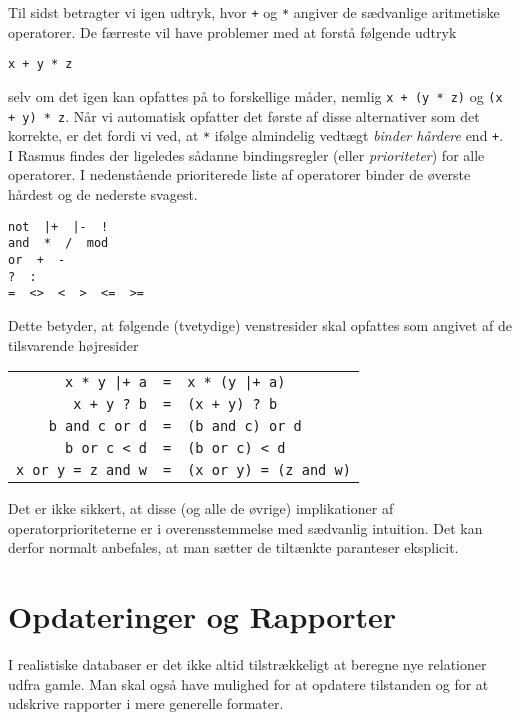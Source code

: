 Til sidst betragter vi igen udtryk, hvor \verb"+" og \verb"*" angiver de
s\ae{}dvanlige aritmetiske operatorer. De f\ae{}rreste vil have
problemer med at forst\aa{} f\o{}lgende udtryk
\begin{center}
\verb"x + y * z"
\end{center}
selv om det igen kan opfattes p\aa{} to forskellige m\aa{}der, nemlig
\verb"x + (y * z)" og \verb"(x + y) * z". N\aa{}r vi automatisk opfatter
det f\o{}rste af disse alternativer som det korrekte, er det fordi vi 
ved, at \verb"*" if\o{}lge almindelig vedt\ae{}gt {\em binder h\aa{}rdere\/}
end \verb"+". I {\sc Rasmus} findes der ligeledes s\aa{}danne
bindings\-reg\-ler (eller {\em prioriteter}) 
for alle operatorer. I nedenst\aa{}ende prioriterede
liste af operatorer
binder de \o{}verste h\aa{}rdest og de nederste svagest.
\begin{center}
\verb"not  |+  |-  !"\\
\verb"and  *  /  mod"\\
\verb"or  +  -"\\
\verb"?  :"\\
\verb"=  <>  <  >  <=  >="
\end{center}
Dette betyder, at f\o{}lgende (tvetydige) venstresider skal opfattes som
angivet af de tilsvarende h\o{}jresider
\begin{center}
\begin{tabular}{rcl}
\verb"x * y |+ a" &\verb"="& \verb"x * (y |+ a)"\\
\verb"x + y ? b" &\verb"="& \verb"(x + y) ? b"\\
\verb"b and c or d" &\verb"="& \verb"(b and c) or d"\\
\verb"b or c < d" &\verb"="& \verb"(b or c) < d"\\
\verb"x or y = z and w" &\verb"="& \verb"(x or y) = (z and w)"
\end{tabular}
\end{center}
Det er ikke sikkert, at disse (og alle de \o{}vrige) implikationer
af operatorprioriteterne er i overensstemmelse med s\ae{}dvanlig
intuition. Det kan derfor normalt 
anbefales, at man s\ae{}tter de tilt\ae{}nkte paranteser eksplicit.

\newpage
\section{Opdateringer og Rapporter}
I realistiske databaser er det ikke altid tilstr\ae{}kkeligt
at beregne nye relationer udfra gamle. Man skal ogs\aa{} have mulighed for
at opdatere tilstanden og for at udskrive rapporter i mere generelle
formater.

